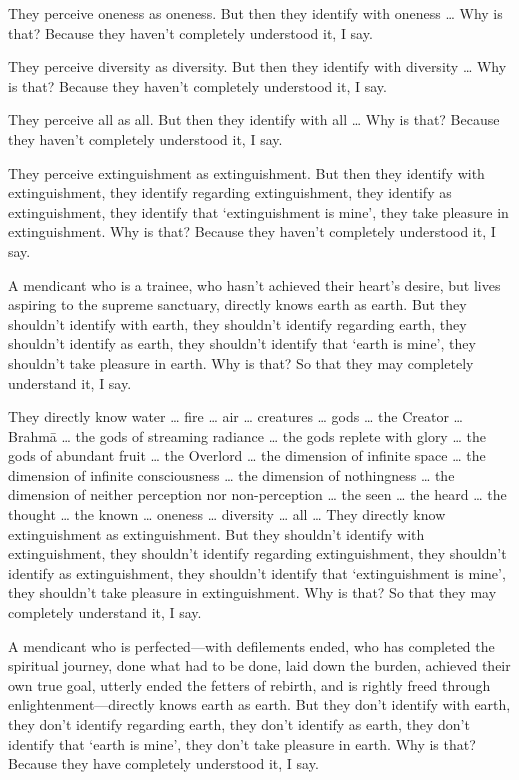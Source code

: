 \documentclass[12pt,openany]{book}%
\begin{document}
They perceive oneness as oneness. But then they identify with oneness … Why is that? Because they haven’t completely understood it, I say. 

They perceive diversity as diversity. But then they identify with diversity … Why is that? Because they haven’t completely understood it, I say. 

They perceive all as all. But then they identify with all … Why is that? Because they haven’t completely understood it, I say. 

They perceive extinguishment as extinguishment. But then they identify with extinguishment, they identify regarding extinguishment, they identify as extinguishment, they identify that ‘extinguishment is mine’, they take pleasure in extinguishment. Why is that? Because they haven’t completely understood it, I say. 

A mendicant who is a trainee, who hasn’t achieved their heart’s desire, but lives aspiring to the supreme sanctuary, directly knows earth as earth. But they shouldn’t identify with earth, they shouldn’t identify regarding earth, they shouldn’t identify as earth, they shouldn’t identify that ‘earth is mine’, they shouldn’t take pleasure in earth. Why is that? So that they may completely understand it, I say. 

They directly know water … fire … air … creatures … gods … the Creator … \textsanskrit{Brahmā} … the gods of streaming radiance … the gods replete with glory … the gods of abundant fruit … the Overlord … the dimension of infinite space … the dimension of infinite consciousness … the dimension of nothingness … the dimension of neither perception nor non-perception … the seen … the heard … the thought … the known … oneness … diversity … all … They directly know extinguishment as extinguishment. But they shouldn’t identify with extinguishment, they shouldn’t identify regarding extinguishment, they shouldn’t identify as extinguishment, they shouldn’t identify that ‘extinguishment is mine’, they shouldn’t take pleasure in extinguishment. Why is that? So that they may completely understand it, I say. 

A mendicant who is perfected—with defilements ended, who has completed the spiritual journey, done what had to be done, laid down the burden, achieved their own true goal, utterly ended the fetters of rebirth, and is rightly freed through enlightenment—directly knows earth as earth. But they don’t identify with earth, they don’t identify regarding earth, they don’t identify as earth, they don’t identify that ‘earth is mine’, they don’t take pleasure in earth. Why is that? Because they have completely understood it, I say. 
\end{document}

